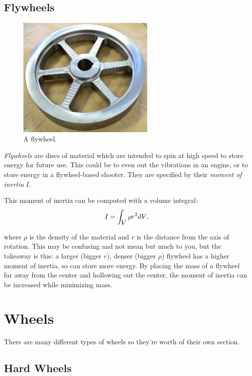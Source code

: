 	\subsection{Flywheels}
	\begin{figure}[H]
		\includegraphics[width=0.6\textwidth]{imgs/flywheel.jpeg}
		\caption{A flywheel.}
	\end{figure}
	\textit{Flywheels} are discs of material which are intended to spin at high speed to store energy for future use. This could be to even out the vibrations in an engine, or to store energy in a flywheel-based shooter. They are specified by their \textit{moment of inertia} $I$. 
	
	This moment of inertia can be computed with a volume integral:
	\begin{align}
		I = \int_{\volume} \rho r^2 d \volume ,
	\end{align}
	
	where $\rho$ is the density of the material and $r$ is the distance from the axis of rotation. This may be confusing and not mean but much to you, but the takeaway is this: a larger (bigger $r$), denser (bigger $\rho$) flywheel has a higher moment of inertia, so can store more energy. By placing the mass of a flywheel far away from the center and hollowing out the center, the moment of inertia can be increased while minimizing mass.	
	
	
\section{Wheels} \label{sec:wheels} 
	There are many different types of wheels so they're worth of their own section.
	
	\subsection{Hard Wheels}
	
